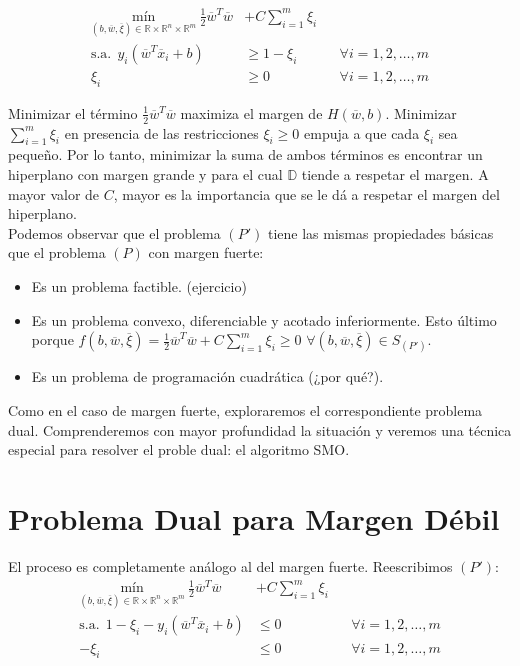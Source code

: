 \documentclass[11pt]{article}
\newcommand{\R}{\mathbb{R}}
\newcommand{\Rn}{\R^{n}}
\newcommand{\Rm}{\R^{m}}
\newcommand{\Runm}{\R\times\Rn\times\Rm}
\newcommand{\xiv}{\overline{\xi}}
\newcommand{\wv}{\overline{w}}
\newcommand{\x}{\overline{x}}
\newcommand{\Sm}{1,2,\ldots, m}
\newcommand{\Dat}{\mathbb{D}}
\begin{document}
\begin{equation*}
\begin{aligned}
 \underset{(b,\wv, \xiv)\in \Runm}{\text{mín}}\ \frac{1}{2}\wv^{T}\wv&+C\sum_{i=1}^{m}\xi_{i}  \\
\text{s.a.}\ \
 y_{i}(\wv^{T}\x_{i}+b)&\geq1-\xi_{i}\ \ &&\forall i=\Sm\\
 \xi_{i}&\geq0\ \ &&\forall i=\Sm
\end{aligned}
\end{equation*}

Minimizar el término $\frac{1}{2}\wv^{T}\wv$ maximiza el margen de $H(\wv, b)$. Minimizar $\sum_{i=1}^{m}\xi_{i}$ en presencia de las restricciones $\xi_{i}\geq0$ empuja a que cada $\xi_{i}$ sea pequeño. Por lo tanto, minimizar la suma de ambos términos es encontrar un hiperplano con margen grande y para el cual $\Dat$ tiende a respetar el margen. A mayor valor de $C$, mayor es la importancia que se le dá a respetar el margen del hiperplano.\\

Podemos observar que el problema $(P')$ tiene las mismas propiedades básicas que el problema $(P)$ con margen fuerte:
\begin{itemize}
\item Es un problema factible. (ejercicio)
\item Es un problema convexo, diferenciable y acotado inferiormente. Esto último porque $f(b, \wv, \xiv)=\frac{1}{2}\wv^{T}\wv+C\sum_{i=1}^{m}\xi_{i}\geq0$ $\forall(b,\wv,\xiv)\in S_{(P')}$.
\item Es un problema de programación cuadrática (¿por qué?).
\end{itemize}

Como en el caso de margen fuerte, exploraremos el correspondiente problema dual. Comprenderemos con mayor profundidad la situación y veremos una técnica especial para resolver el proble dual: el algoritmo SMO.

\section{Problema Dual para Margen Débil}
El proceso es completamente análogo al del margen fuerte. Reescribimos $(P')$:
\begin{equation*}
\begin{aligned}
 \underset{(b,\wv, \xiv)\in \Runm}{\text{mín}}\ \frac{1}{2}\wv^{T}\wv&+C\sum_{i=1}^{m}\xi_{i}  \\
\text{s.a.}\ \
 1-\xi_{i}-y_{i}(\wv^{T}\x_{i}+b)&\leq0\ \ &&\forall i=\Sm\\
 -\xi_{i}&\leq0\ \ &&\forall i=\Sm
\end{aligned}
\end{equation*}
\end{document}
